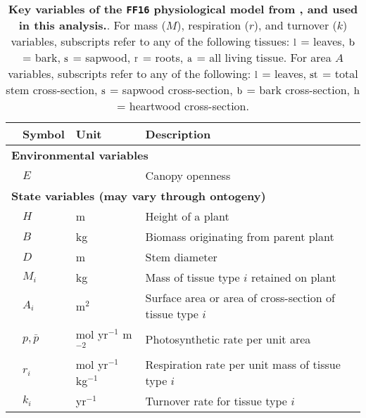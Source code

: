 \documentclass[a4paper,11pt]{article}
\begin{document}
\begin{table}[ht]
 \caption{\textbf{Key variables of the \texttt{FF16} physiological model from {\plant}, and used in this analysis.}. For mass ($M$), respiration ($r$), and turnover ($k$)
variables, subscripts refer to any of the following tissues: \({\rm l}\) = leaves, \({\rm b}\) = bark, \({\rm s}\) = sapwood,
\({\rm r}\) = roots, \({\rm a}\) = all living tissue. For area \(A\) variables, subscripts refer to any of the following: \({\rm l}\) = leaves, \({\rm st}\) = total stem cross-section, \({\rm s}\) = sapwood cross-section, \({\rm b}\) = bark cross-section, \({\rm h}\) = heartwood cross-section.}
\centering
{\footnotesize 
\begin{tabular}{p{0.1cm}p{2cm}p{2.5cm}p{8cm}}
\\
\hline
& Symbol & Unit & Description \\
\hline
\multicolumn{4}{l}{\textbf{Environmental variables}} \\
& $E$ & & Canopy openness\\
\multicolumn{4}{l}{\textbf{State variables (may vary through ontogeny)}} \\
& $H$ & m & Height of a plant\\
& $B$ & kg & Biomass originating from parent plant\\
& $D$ & m & Stem diameter\\
& $M_i$ & kg & Mass of tissue type $i$ retained on plant \\
& $A_i$ & m$^2$ & Surface area or area of cross-section of tissue type $i$\\
& $p,\bar{p}$ & mol yr$^{-1}$ m$^{-2}$ & Photosynthetic rate per unit area \\
& $r_i$ & mol yr$^{-1}$ kg$^{-1}$  & Respiration rate per unit mass of tissue type $i$ \\
& $k_i$ & yr$^{-1}$ & Turnover rate for tissue type $i$ \\


\end{tabular}}
\end{table}
\end{document}
